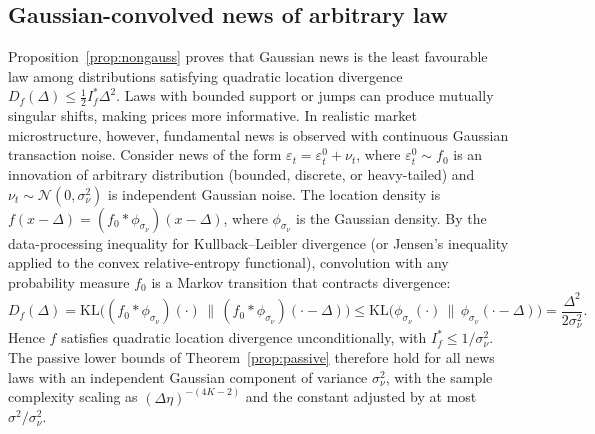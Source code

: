 \subsection{Gaussian-convolved news of arbitrary law}\label{app:convolvednews}\label{app:convexdealer}

Proposition~\ref{prop:nongauss} proves that Gaussian news is the least favourable law among distributions satisfying quadratic location divergence $D_f(\Delta)\le\frac12I^*_f\Delta^2$. Laws with bounded support or jumps can produce mutually singular shifts, making prices more informative. In realistic market microstructure, however, fundamental news is observed with continuous Gaussian transaction noise. Consider news of the form $\varepsilon_t=\varepsilon^0_t+\nu_t$, where $\varepsilon^0_t\sim f_0$ is an innovation of arbitrary distribution (bounded, discrete, or heavy-tailed) and $\nu_t\sim\mathcal N(0,\sigma_\nu^2)$ is independent Gaussian noise. The location density is $f(x-\Delta)=(f_0*\phi_{\sigma_\nu})(x-\Delta)$, where $\phi_{\sigma_\nu}$ is the Gaussian density. By the data-processing inequality for Kullback--Leibler divergence (or Jensen's inequality applied to the convex relative-entropy functional), convolution with any probability measure $f_0$ is a Markov transition that contracts divergence:
\[
D_f(\Delta) = \mathrm{KL}\bigl((f_0*\phi_{\sigma_\nu})(\cdot)\,\big\|\,(f_0*\phi_{\sigma_\nu})(\cdot-\Delta)\bigr) \le \mathrm{KL}\bigl(\phi_{\sigma_\nu}(\cdot)\,\big\|\,\phi_{\sigma_\nu}(\cdot-\Delta)\bigr) = \frac{\Delta^2}{2\sigma_\nu^2}.
\]
Hence $f$ satisfies quadratic location divergence unconditionally, with $I^*_f\le1/\sigma_\nu^2$. The passive lower bounds of Theorem~\ref{prop:passive} therefore hold for all news laws with an independent Gaussian component of variance $\sigma_\nu^2$, with the sample complexity scaling as $(\Delta\eta)^{-(4K-2)}$ and the constant adjusted by at most $\sigma^2/\sigma_\nu^2$.
